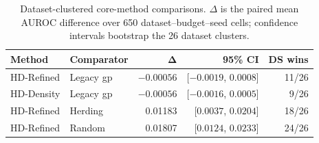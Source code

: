 \begin{table}[!t]
\centering
\caption{Dataset-clustered core-method comparisons. $\Delta$ is the paired mean
AUROC difference over 650 dataset--budget--seed cells; confidence intervals
bootstrap the 26 dataset clusters.}
\label{tab:pairwise}
\scriptsize
\setlength{\tabcolsep}{2.5pt}
\begin{tabular}{@{}llrrr@{}}
\toprule
\textbf{Method} & \textbf{Comparator} & $\boldsymbol{\Delta}$ &
  \textbf{95\% CI} & \textbf{DS wins} \\
\midrule
HD-Refined & Legacy gp & $-0.00056$ & [$-0.0019$, $0.0008$] & 11/26 \\
HD-Density & Legacy gp & $-0.00056$ & [$-0.0016$, $0.0005$] & 9/26 \\
HD-Refined & Herding & 0.01183 & [$0.0037$, $0.0204$] & 18/26 \\
HD-Refined & Random & 0.01807 & [$0.0124$, $0.0233$] & 24/26 \\
\bottomrule
\end{tabular}
\end{table}
